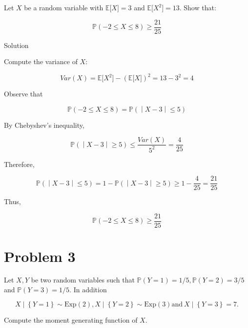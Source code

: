 \documentclass{qlnotes-export}
\begin{document}
Let \(X\) be a random variable with \({\mathbb{E}}\lbrack X\rbrack = 3\) and \({\mathbb{E}}\lbrack X^{2}\rbrack = 13\). Show that:

\[{\mathbb{P}}( - 2 \leq X \leq 8) \geq \frac{21}{25}\]

\begin{qlsolution}{Solution}

Compute the variance of \(X\):

\[Var(X) = {\mathbb{E}}\lbrack X^{2}\rbrack - ({\mathbb{E}}\lbrack X\rbrack)^{2} = 13 - 3^{2} = 4\]

Observe that

\[\left. {\mathbb{P}}( - 2 \leq X \leq 8) = {\mathbb{P}}( \middle| X - 3 \middle| \leq 5) \right.\]

By Chebyshev's inequality,

\[\left. {\mathbb{P}}( \middle| X - 3 \middle| \geq 5) \leq \frac{Var(X)}{5^{2}} = \frac{4}{25} \right.\]

Therefore,

\[\left. {\mathbb{P}}( \middle| X - 3 \middle| \leq 5) = 1 - {\mathbb{P}}( \middle| X - 3 \middle| \geq 5) \geq 1 - \frac{4}{25} = \frac{21}{25} \right.\]

Thus,

\[{\mathbb{P}}( - 2 \leq X \leq 8) \geq \frac{21}{25}\]

\end{qlsolution}

\section{Problem 3}\label{problem-3-4}

Let \(X,Y\) be two random variables such that \({\mathbb{P}}(Y = 1) = 1/5,{\mathbb{P}}(Y = 2) = 3/5\) and \({\mathbb{P}}(Y = 3) = 1/5\). In addition

\[\left. X \middle| \left\{ {Y = 1} \right\} \sim \text{Exp}(2),X \middle| \left\{ {Y = 2} \right\} \sim \text{Exp}(3)\text{and}\ X \mid \left\{ {Y = 3} \right\} = 7. \right.\]

Compute the moment generating function of \(X\).
\end{document}
